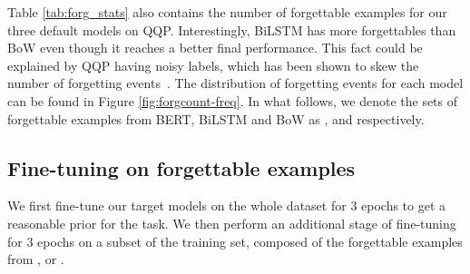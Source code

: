 Table \ref{tab:forg_stats} also contains the number of forgettable examples for our three default models on QQP. Interestingly, BiLSTM has more forgettables than BoW even though it reaches a better final performance. This fact could be explained by QQP having noisy labels, which has been shown to skew the number of forgetting events~\citep{toneva2018empirical}. The distribution of forgetting events for each model can be found in Figure \ref{fig:forgcount-freq}. In what follows, we denote the sets of forgettable examples from BERT, BiLSTM and BoW as \fbert, \flstm and \fbow  respectively.

\subsection{Fine-tuning on forgettable examples}
\label{sec:fine_tune}
We first fine-tune our target models on the whole dataset for $3$ epochs  to get a reasonable prior for the task. We then perform an additional stage of fine-tuning for $3$ epochs on a subset of the training set, composed of the forgettable examples from \fbert, \flstm or \fbow . 
